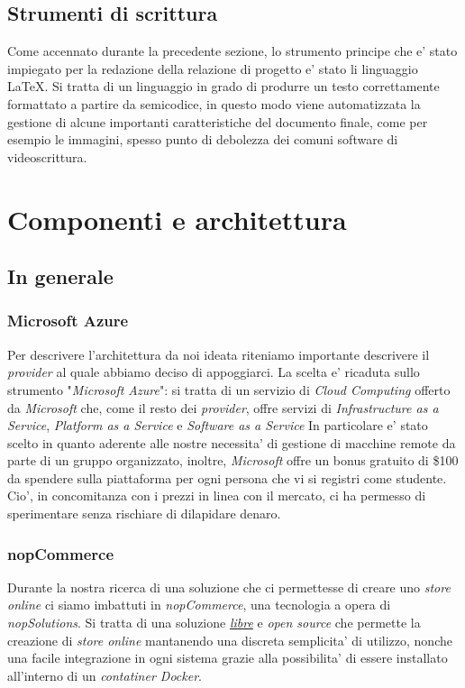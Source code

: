 \documentclass[a4paper]{report}
\begin{document}
	\section{Strumenti di scrittura} \label{strumenti_di_scrittura}
		Come accennato durante la precedente sezione, lo strumento principe che e' stato impiegato per la redazione
		della relazione di progetto e' stato li linguaggio \LaTeX{}. Si tratta di un linguaggio in grado di produrre un
		testo correttamente formattato a partire da semicodice, in questo modo viene automatizzata la gestione di alcune
		importanti caratteristiche del documento finale, come per esempio le immagini, spesso punto di debolezza dei
		comuni software di videoscrittura.
\chapter{Componenti e architettura} \label{componenti_e_architettura}
	\section{In generale} \label{in_generale}
		\subsection{Microsoft Azure} \label{microsoft_azure}
			Per descrivere l'architettura da noi ideata riteniamo importante descrivere il \emph{provider} al quale
			abbiamo deciso di appoggiarci. La scelta e' ricaduta sullo strumento "\emph{Microsoft Azure}": si tratta
			di un servizio di \emph{Cloud Computing} offerto da \emph{Microsoft} che, come il resto dei \emph{provider}, offre servizi di \emph{Infrastructure as a 			Service}, \emph{Platform as a Service} e \emph{Software as a Service}
			In particolare e' stato scelto in quanto aderente alle nostre necessita' di gestione di macchine remote da
			parte di un gruppo organizzato, inoltre, \emph{Microsoft} offre un bonus gratuito di \$100 da spendere
			sulla piattaforma per ogni persona che vi si registri come studente. Cio', in concomitanza con i prezzi in
			linea con il mercato, ci ha permesso di sperimentare senza rischiare di dilapidare denaro.
		\subsection{nopCommerce} \label{nopcommerce}
			Durante la nostra ricerca di una soluzione che ci permettesse di creare uno \emph{store online} ci siamo
			imbattuti in \emph{nopCommerce}, una tecnologia a opera di \emph{nopSolutions}. Si tratta di una soluzione
			\href{https://github.com/nopSolutions/nopCommerce/blob/develop/LICENSE.md}{\emph{libre}} e
			\emph{open source} che permette la creazione di \emph{store online} mantanendo una discreta
			semplicita' di utilizzo, nonche una facile integrazione in ogni sistema grazie alla possibilita' di essere
			installato all'interno di un \emph{contatiner Docker}.
\end{document}
